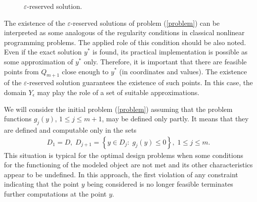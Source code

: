 \documentclass[twocolumn]{svjour3}          %
\begin{document}
\begin{figure}
	\caption{$\varepsilon$-reserved solution.}
	\label{fig:eps_reserved_solution}
\end{figure}

	The existence of the $\varepsilon$-reserved solutions of problem (\ref{problem}) can be interpreted as some analogous of the regularity conditions in classical nonlinear programming problems. The applied role of this condition should be also noted. Even if the exact solution $y^\ast$ is found, its practical implementation is possible as some approximation of $y^\ast$ only. Therefore, it is important that there are feasible points from $Q_{m+1}$ close enough to $y^\ast$ (in coordinates and values). The existence of the $\varepsilon$-reserved solution guarantees the existence of such points. In this case, the domain $Y_{\epsilon}$ may play the role of a set of suitable approximations.

	We will consider the initial problem (\ref{problem}) assuming that the problem functions $g_{j}(y)$, $1 \leq j \leq m+1$, may be defined only partly. It means that they are defined and computable only in the sets
\small
\begin{align}\label{D_sets}
	D_1 = D, \; D_{j+1} = \left\{ y \in D_j: \; g_j(y) \leq 0 \right\}, \; 1 \leq j \leq m.
\end{align}
\normalsize
This situation is typical for the optimal design problems when some conditions for the functioning of the modeled object are not met and its other characteristics appear to be undefined. In this approach, the first violation of any constraint indicating that the point $y$ being considered is no longer feasible terminates further computations at the point $y$.
\end{document}
